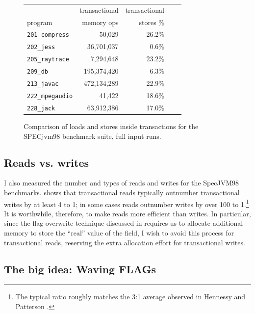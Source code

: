 \begin{figure}\sis%
\begin{center}
\begin{tabular}{lrrrr}
        & transactional & transactional\\
program & memory ops    & stores \% \\\hline
{\tt 201\_compress} & 50,029 & 26.2\% \\
{\tt 202\_jess} & 36,701,037 & 0.6\% \\
{\tt 205\_raytrace} & 7,294,648 & 23.2\% \\
{\tt 209\_db} & 195,374,420 & 6.3\% \\
{\tt 213\_javac} & 472,134,289 & 22.9\% \\
{\tt 222\_mpegaudio} & 41,422 & 18.6\% \\
{\tt 228\_jack} & 63,912,386 & 17.0\% \\
\end{tabular}
\end{center}
\caption{Comparison of loads and stores inside transactions for the
  SPECjvm98 benchmark suite, full input runs.}
\label{fig:writepercent}
\end{figure}
\subsection{Reads vs. writes}
I also measured the number and types of reads and writes for the
SpecJVM98 benchmarks.
 shows that transactional reads typically
outnumber transactional writes by at least 4 to 1; in some cases reads
outnumber writes by over 100 to 1.\footnote{The typical ratio roughly
  matches the 3:1 average observed in Hennessy and Patterson
  \cite[pp. 105, 379]{HennessyPa96}.}  It is worthwhile, therefore, to
make reads more efficient than writes.  In particular, since the
flag-overwrite technique discussed in  requires us
to allocate additional memory to store the ``real'' value of the
field, I wish to avoid this process for transactional reads,
reserving the extra allocation effort for transactional writes.

\subsection{The big idea: Waving FLAGs}\label{sec:flagfield}

